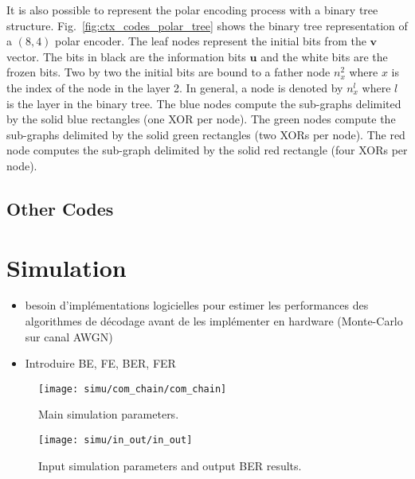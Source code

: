 It is also possible to represent the polar encoding process with a binary tree
structure. Fig.~\ref{fig:ctx_codes_polar_tree} shows the binary tree
representation of a $(8,4)$ polar encoder. The leaf nodes represent the initial
bits from the $\bm{v}$ vector. The bits in black are the information bits
$\bm{u}$ and the white bits are the frozen bits. Two by two the initial bits are
bound to a father node $n_x^2$ where $x$ is the index of the node in the layer
2. In general, a node is denoted by $n_x^l$ where $l$ is the layer in the binary
tree. The {\color{Paired-1} blue} nodes compute the sub-graphs delimited by the
solid {\color{Paired-1} blue} rectangles (one XOR per node). The
{\color{Paired-3} green} nodes compute the sub-graphs delimited by the solid
{\color{Paired-3} green} rectangles (two XORs per node). The {\color{Paired-5}
red} node computes the sub-graph delimited by the solid {\color{Paired-5} red}
rectangle (four XORs per node).

\subsection{Other Codes}

\section{Simulation}

\begin{itemize}
  \item besoin d'implémentations logicielles pour estimer les performances des
    algorithmes de décodage avant de les implémenter en hardware (Monte-Carlo
    sur canal AWGN)
  \item Introduire BE, FE, BER, FER
\end{itemize}

\begin{figure}[htp]
  \centering
  \texttt{[image: simu/com\_chain/com\_chain]}
  \caption{Main simulation parameters.}
  \label{fig:simu_com_chain}
\end{figure}

\begin{figure}[htp]
  \centering
  \texttt{[image: simu/in\_out/in\_out]}
  \caption{Input simulation parameters and output BER results.}
  \label{fig:intro_in_out}
\end{figure}

